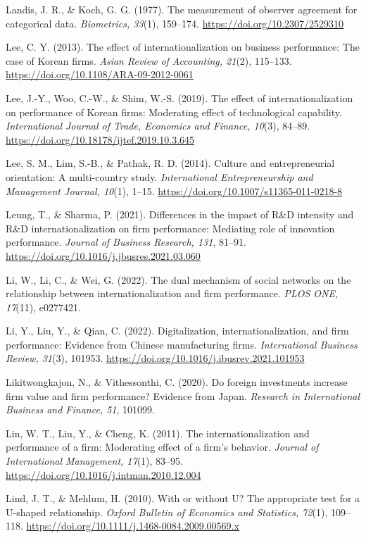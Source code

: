 \documentclass[
  a4paper,
  13pt]{extreport}
\begin{document}
Landis, J. R., \& Koch, G. G. (1977). The measurement of observer
agreement for categorical data. \emph{Biometrics, 33}(1), 159--174.
\url{https://doi.org/10.2307/2529310}

Lee, C. Y. (2013). The effect of internationalization on business
performance: The case of Korean firms. \emph{Asian Review of Accounting,
21}(2), 115--133. \url{https://doi.org/10.1108/ARA-09-2012-0061}

Lee, J.-Y., Woo, C.-W., \& Shim, W.-S. (2019). The effect of
internationalization on performance of Korean firms: Moderating effect
of technological capability. \emph{International Journal of Trade,
Economics and Finance, 10}(3), 84--89.
\url{https://doi.org/10.18178/ijtef.2019.10.3.645}

Lee, S. M., Lim, S.-B., \& Pathak, R. D. (2014). Culture and
entrepreneurial orientation: A multi-country study. \emph{International
Entrepreneurship and Management Journal, 10}(1), 1--15.
\url{https://doi.org/10.1007/s11365-011-0218-8}

Leung, T., \& Sharma, P. (2021). Differences in the impact of R\&D
intensity and R\&D internationalization on firm performance: Mediating
role of innovation performance. \emph{Journal of Business Research,
131}, 81--91. \url{https://doi.org/10.1016/j.jbusres.2021.03.060}

Li, W., Li, C., \& Wei, G. (2022). The dual mechanism of social networks
on the relationship between internationalization and firm performance.
\emph{PLOS ONE, 17}(11), e0277421.

Li, Y., Liu, Y., \& Qian, C. (2022). Digitalization,
internationalization, and firm performance: Evidence from Chinese
manufacturing firms. \emph{International Business Review, 31}(3),
101953. \url{https://doi.org/10.1016/j.ibusrev.2021.101953}

Likitwongkajon, N., \& Vithessonthi, C. (2020). Do foreign investments
increase firm value and firm performance? Evidence from Japan.
\emph{Research in International Business and Finance, 51}, 101099.

Lin, W. T., Liu, Y., \& Cheng, K. (2011). The internationalization and
performance of a firm: Moderating effect of a firm's behavior.
\emph{Journal of International Management, 17}(1), 83--95.
\url{https://doi.org/10.1016/j.intman.2010.12.004}

Lind, J. T., \& Mehlum, H. (2010). With or without U? The appropriate
test for a U-shaped relationship. \emph{Oxford Bulletin of Economics and
Statistics, 72}(1), 109--118.
\url{https://doi.org/10.1111/j.1468-0084.2009.00569.x}
\end{document}
